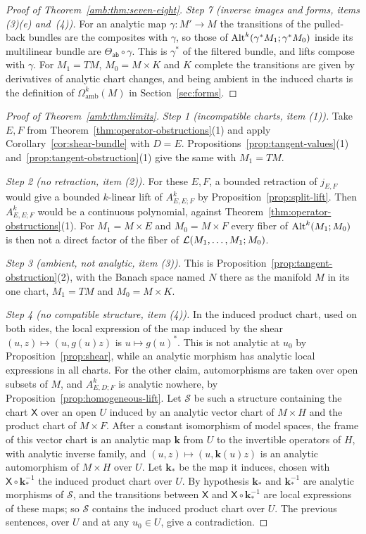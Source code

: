 \begin{proof}[Proof of Theorem~\ref{amb:thm:seven-eight}]
\emph{Step 7 (inverse images and forms, items (3)(e) and~(4)).} For an analytic map $\gamma\colon M'\to M$ the transitions of the pulled-back bundles are the composites with $\gamma$, so those of $\operatorname{Alt}^k(\gamma^*M_1;\gamma^*M_0)$ inside its multilinear bundle are $\Theta_{\mathsf{ab}}\circ\gamma$. This is $\gamma^*$ of the filtered bundle, and lifts compose with $\gamma$. For $M_1=TM$, $M_0=M\times K$ and $K$ complete the transitions are given by derivatives of analytic chart changes, and being ambient in the induced charts is the definition of $\Omega^k_{\mathrm{amb}}(M)$ in Section~\ref{sec:forms}.
\end{proof}

\begin{proof}[Proof of Theorem~\ref{amb:thm:limits}]
\emph{Step 1 (incompatible charts, item (1)).} Take $E,F$ from Theorem~\ref{thm:operator-obstructions}(1) and apply Corollary~\ref{cor:shear-bundle} with $D=E$. Propositions~\ref{prop:tangent-values}(1) and~\ref{prop:tangent-obstruction}(1) give the same with $M_1=TM$.

\emph{Step 2 (no retraction, item (2)).} For these $E,F$, a bounded retraction of $j_{E,F}$ would give a bounded $k$\nobreakdash-linear lift of $A^k_{E,E;F}$ by Proposition~\ref{prop:split-lift}. Then $A^k_{E,E;F}$ would be a continuous polynomial, against Theorem~\ref{thm:operator-obstructions}(1). For $M_1=M\times E$ and $M_0=M\times F$ every fiber of $\operatorname{Alt}^k(M_1;M_0)$ is then not a direct factor of the fiber of $\mathcal L(M_1,\dots,M_1;M_0)$.

\emph{Step 3 (ambient, not analytic, item (3)).} This is Proposition~\ref{prop:tangent-obstruction}(2), with the Banach space named $N$ there as the manifold $M$ in its one chart, $M_1=TM$ and $M_0=M\times K$.

\emph{Step 4 (no compatible structure, item (4)).} In the induced product chart, used on both sides, the local expression of the map induced by the shear $(u,z)\mapsto(u,g(u)z)$ is $u\mapsto g(u)^*$. This is not analytic at $u_0$ by Proposition~\ref{prop:shear}, while an analytic morphism has analytic local expressions in all charts. For the other claim, automorphisms are taken over open subsets of $M$, and $A^k_{E,D;F}$ is analytic nowhere, by Proposition~\ref{prop:homogeneous-lift}. Let $\mathcal S$ be such a structure containing the chart $\mathsf X$ over an open $U$ induced by an analytic vector chart of $M\times H$ and the product chart of $M\times F$. After a constant isomorphism of model spaces, the frame of this vector chart is an analytic map $\mathbf k$ from $U$ to the invertible operators of $H$, with analytic inverse family, and $(u,z)\mapsto(u,\mathbf k(u)z)$ is an analytic automorphism of $M\times H$ over $U$. Let $\mathbf k_*$ be the map it induces, chosen with $\mathsf X\circ\mathbf k_*^{-1}$ the induced product chart over $U$. By hypothesis $\mathbf k_*$ and $\mathbf k_*^{-1}$ are analytic morphisms of $\mathcal S$, and the transitions between $\mathsf X$ and $\mathsf X\circ\mathbf k_*^{-1}$ are local expressions of these maps; so $\mathcal S$ contains the induced product chart over $U$. The previous sentences, over $U$ and at any $u_0\in U$, give a contradiction.


\end{proof}
